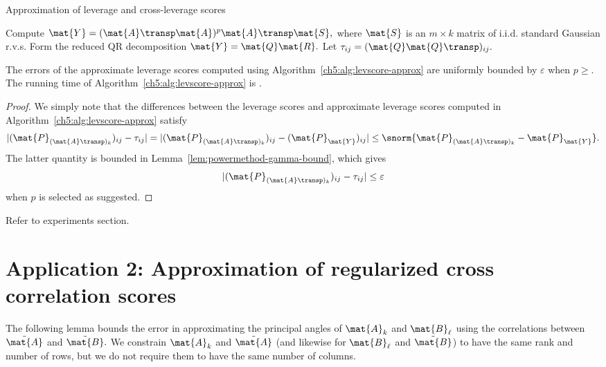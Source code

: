 \begin{algorithm}

 \caption{Approximation of leverage and cross-leverage scores}
 \label{ch5:alg:levscore-approx}
 \algrenewcommand{}
 \algrenewcommand{}
 \begin{algorithmic}[1]
  \Statex
  
 \State Compute $\mat{Y} = (\mat{A}\transp \mat{A})^p \mat{A}\transp \mat{S},$
where $\mat{S}$ is an $m \times k$ matrix of i.i.d. standard Gaussian r.v.s. 
 \State Form the reduced QR decomposition $\mat{Y} = \mat{Q} \mat{R}.$
 \State Let $\tau_{ij} = (\mat{Q}\mat{Q}\transp)_{ij}.$
  \end{algorithmic}
\end{algorithm}

\begin{thm}
The errors of the approximate leverage scores computed using
Algorithm~\ref{ch5:alg:levscore-approx} are uniformly bounded by $\varepsilon$ when
$p \geq .$ The running time of Algorithm~\ref{ch5:alg:levscore-approx} is .
\end{thm}

\begin{proof}
We simply note that the differences between the leverage scores and approximate
leverage scores computed in Algorithm~\ref{ch5:alg:levscore-approx} satisfy
\[
| (\mat{P}_{(\mat{A}\transp)_k})_{ij} - \tau_{ij}| = |
(\mat{P}_{(\mat{A}\transp)_k})_{ij} - (\mat{P}_{\mat{Y}})_{ij} | \leq
\snorm{\mat{P}_{(\mat{A}\transp)_k} - \mat{P}_{\mat{Y}}}.
\]
The latter quantity is bounded in Lemma~\ref{lem:powermethod-gamma-bound}, which
gives
\[
| (\mat{P}_{(\mat{A}\transp)_k})_{ij} - \tau_{ij}| \leq \varepsilon
\]
when $p$ is selected as suggested.
\end{proof}

Refer to experiments section.

\section{Application 2: Approximation of regularized cross correlation scores}

The following lemma bounds the error in approximating the principal angles of
$\mat{A}_k$ and $\mat{B}_\ell$ using the correlations between $\tilde{\mat{A}}$
and $\tilde{\mat{B}}.$ We constrain $\mat{A}_k$ and $\tilde{\mat{A}}$ (and
likewise for $\mat{B}_\ell$ and $\tilde{\mat{B}}$) to have the same rank and
number of rows, but we do not require them to have the same number of columns. 

